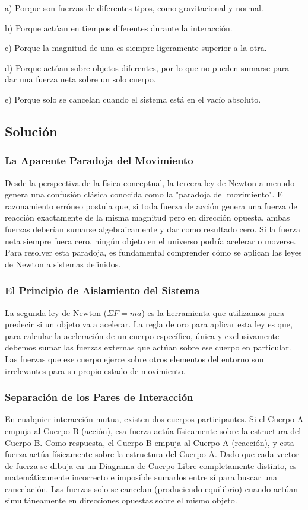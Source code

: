 \documentclass[12pt]{article}
\begin{document}
a) Porque son fuerzas de diferentes tipos, como gravitacional y normal.

b) Porque actúan en tiempos diferentes durante la interacción.

c) Porque la magnitud de una es siempre ligeramente superior a la otra.

d) Porque actúan sobre objetos diferentes, por lo que no pueden sumarse para dar una fuerza neta sobre un solo cuerpo.

e) Porque solo se cancelan cuando el sistema está en el vacío absoluto.

\subsection*{Solución}

\subsubsection*{La Aparente Paradoja del Movimiento}
Desde la perspectiva de la física conceptual, la tercera ley de Newton a menudo genera una confusión clásica conocida como la "paradoja del movimiento". El razonamiento erróneo postula que, si toda fuerza de acción genera una fuerza de reacción exactamente de la misma magnitud pero en dirección opuesta, ambas fuerzas deberían sumarse algebraicamente y dar como resultado cero. Si la fuerza neta siempre fuera cero, ningún objeto en el universo podría acelerar o moverse. Para resolver esta paradoja, es fundamental comprender cómo se aplican las leyes de Newton a sistemas definidos.

\subsubsection*{El Principio de Aislamiento del Sistema}
La segunda ley de Newton ($\Sigma F = ma$) es la herramienta que utilizamos para predecir si un objeto va a acelerar. La regla de oro para aplicar esta ley es que, para calcular la aceleración de un cuerpo específico, única y exclusivamente debemos sumar las fuerzas externas que actúan sobre ese cuerpo en particular. Las fuerzas que ese cuerpo ejerce sobre otros elementos del entorno son irrelevantes para su propio estado de movimiento.

\subsubsection*{Separación de los Pares de Interacción}
En cualquier interacción mutua, existen dos cuerpos participantes. Si el Cuerpo A empuja al Cuerpo B (acción), esa fuerza actúa físicamente sobre la estructura del Cuerpo B. Como respuesta, el Cuerpo B empuja al Cuerpo A (reacción), y esta fuerza actúa físicamente sobre la estructura del Cuerpo A. Dado que cada vector de fuerza se dibuja en un Diagrama de Cuerpo Libre completamente distinto, es matemáticamente incorrecto e imposible sumarlos entre sí para buscar una cancelación. Las fuerzas solo se cancelan (produciendo equilibrio) cuando actúan simultáneamente en direcciones opuestas sobre el mismo objeto.
\end{document}

